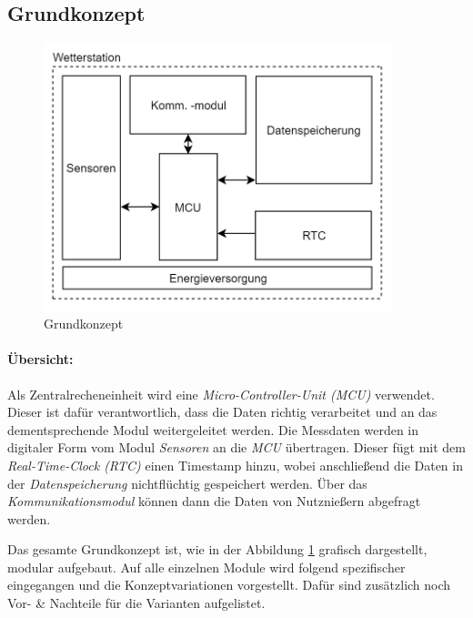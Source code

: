 \subsection{Grundkonzept}
\label{chap:grundkonzept}
\begin{figure}[h]
	\centering
	\includegraphics[width=0.9\textwidth]{graphics/Grundkonzept.PNG}
	\caption{Grundkonzept}
	\label{fig:grundkonzept}
\end{figure}

\paragraph{Übersicht:}
Als Zentralrecheneinheit wird eine \textit{Micro-Controller-Unit (MCU)} verwendet. Dieser ist dafür verantwortlich, dass die Daten richtig verarbeitet und an das dementsprechende Modul weitergeleitet werden. Die Messdaten werden in digitaler Form vom Modul \textit{Sensoren} an die \textit{MCU} übertragen. Dieser fügt mit dem \textit{Real-Time-Clock (RTC)} einen Timestamp hinzu, wobei anschließend die Daten in der \textit{Datenspeicherung} nichtflüchtig gespeichert werden. Über das \textit{Kommunikationsmodul} können dann die Daten von Nutznießern abgefragt werden.

Das gesamte Grundkonzept ist, wie in der Abbildung \ref{fig:grundkonzept} grafisch dargestellt, modular aufgebaut. Auf alle einzelnen Module wird folgend spezifischer eingegangen und die Konzeptvariationen vorgestellt. Dafür sind zusätzlich noch Vor- \& Nachteile für die Varianten aufgelistet.\\
\newpage

